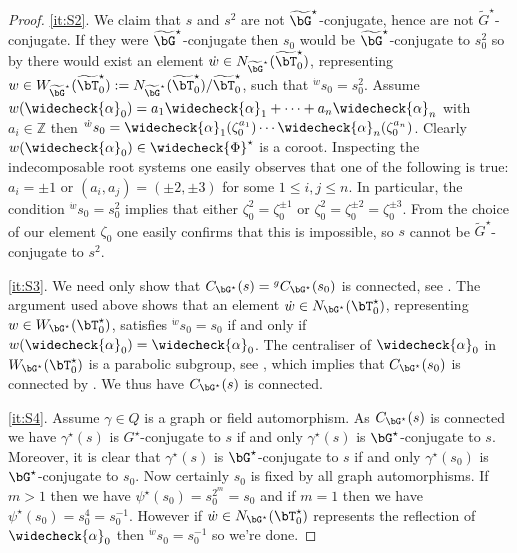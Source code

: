 \documentclass[eqthmnum, nocolour]{jt-calcs}
\begin{document}
\begin{proof}
\cref{it:S2}. We claim that $s$ and $s^2$ are not $\widetilde{\bG}^{\star}$-conjugate, hence are not $\widetilde{G}^{\star}$-conjugate. If they were $\widetilde{\bG}^{\star}$-conjugate then $s_0$ would be $\widetilde{\bG}^{\star}$-conjugate to $s_0^2$ so by \cite[3.7.1]{carter:1993:finite-groups-of-lie-type} there would exist an element $\dot{w} \in N_{\widetilde{\bG}^{\star}}(\widetilde{\bT}_0^{\star})$, representing $w \in W_{\widetilde{\bG}^{\star}}(\widetilde{\bT}_0^{\star}) := N_{\widetilde{\bG}^{\star}}(\widetilde{\bT}_0^{\star})/\widetilde{\bT}_0^{\star}$, such that ${}^{\dot{w}}s_0 = s_0^2$. Assume $w(\widecheck{\alpha}_0) = a_1\widecheck{\alpha}_1+\cdots+a_n\widecheck{\alpha}_n$ with $a_i \in \mathbb{Z}$ then ${}^{\dot{w}}s_0 = \widecheck{\alpha}_1(\zeta_0^{a_1})\cdots \widecheck{\alpha}_n(\zeta_0^{a_n})$. Clearly $w(\widecheck{\alpha}_0) \in \widecheck{\Phi}^{\star}$ is a coroot. Inspecting the indecomposable root systems one easily observes that one of the following is true: $a_i = \pm 1$ or $(a_i,a_j) = (\pm 2, \pm 3)$ for some $1 \leqslant i,j \leqslant n$. In particular, the condition ${}^{\dot{w}}s_0 = s_0^2$ implies that either $\zeta_0^2 = \zeta_0^{\pm 1}$ or $\zeta_0^2 = \zeta_0^{\pm 2} = \zeta_0^{\pm 3}$. From the choice of our element $\zeta_0$ one easily confirms that this is impossible, so $s$ cannot be $\widetilde{G}^{\star}$-conjugate to $s^2$.

\cref{it:S3}. We need only show that $C_{\bG^{\star}}(s) = {}^gC_{\bG^{\star}}(s_0)$ is connected, see \cite[2.8(a)]{bonnafe:2005:quasi-isolated}. The argument used above shows that an element $\dot{w} \in N_{\bG^{\star}}(\bT_0^{\star})$, representing $w \in W_{\bG^{\star}}(\bT_0^{\star})$, satisfies ${}^{\dot{w}}s_0 = s_0$ if and only if $w(\widecheck{\alpha}_0) = \widecheck{\alpha}_0$. The centraliser of $\widecheck{\alpha}_0$ in $W_{\bG^{\star}}(\bT_0^{\star})$ is a parabolic subgroup, see \cite[A.29]{malle-testerman:2011:linear-algebraic-groups}, which implies that $C_{\bG^{\star}}(s_0)$ is connected by \cite[2.4]{digne-michel:1991:representations-of-finite-groups-of-lie-type}. We thus have $C_{\bG^{\star}}(s)$ is connected.

\cref{it:S4}. Assume $\gamma \in Q$ is a graph or field automorphism. As $C_{\bG^{\star}}(s)$ is connected we have $\gamma^{\star}(s)$ is $G^{\star}$-conjugate to $s$ if and only $\gamma^{\star}(s)$ is $\bG^{\star}$-conjugate to $s$. Moreover, it is clear that $\gamma^{\star}(s)$ is $\bG^{\star}$-conjugate to $s$ if and only $\gamma^{\star}(s_0)$ is $\bG^{\star}$-conjugate to $s_0$. Now certainly $s_0$ is fixed by all graph automorphisms. If $m > 1$ then we have $\psi^{\star}(s_0) = s_0^{2^m} = s_0$ and if $m = 1$ then we have $\psi^{\star}(s_0) = s_0^4 = s_0^{-1}$. However if $\dot{w} \in N_{\bG^{\star}}(\bT_0^{\star})$ represents the reflection of $\widecheck{\alpha}_0$ then ${}^{\dot{w}}s_0 = s_0^{-1}$ so we're done.
\end{proof}
\end{document}
